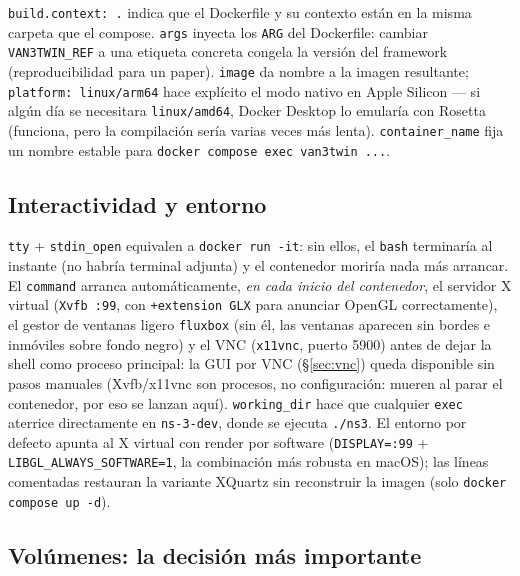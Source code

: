 \documentclass[11pt,a4paper]{article}
\begin{document}
\begin{implicacion}
\texttt{build.context: .} indica que el Dockerfile y su contexto est\'an en
la misma carpeta que el compose. \texttt{args} inyecta los \texttt{ARG} del
Dockerfile: cambiar \texttt{VAN3TWIN\_REF} a una etiqueta concreta congela la
versi\'on del framework (reproducibilidad para un paper). \texttt{image} da
nombre a la imagen resultante; \texttt{platform: linux/arm64} hace expl\'icito
el modo nativo en Apple Silicon --- si alg\'un d\'ia se necesitara
\texttt{linux/amd64}, Docker Desktop lo emular\'ia con Rosetta (funciona, pero
la compilaci\'on ser\'ia varias veces m\'as lenta). \texttt{container\_name}
fija un nombre estable para \texttt{docker compose exec van3twin ...}.
\end{implicacion}

\subsection{Interactividad y entorno}

\begin{implicacion}
\texttt{tty} + \texttt{stdin\_open} equivalen a \texttt{docker run -it}: sin
ellos, el \texttt{bash} terminar\'ia al instante (no habr\'ia terminal
adjunta) y el contenedor morir\'ia nada m\'as arrancar. El \texttt{command}
arranca autom\'aticamente, \emph{en cada inicio del contenedor}, el servidor
X virtual (\texttt{Xvfb :99}, con \texttt{+extension GLX} para anunciar
OpenGL correctamente), el gestor de ventanas ligero \texttt{fluxbox} (sin
\'el, las ventanas aparecen sin bordes e inm\'oviles sobre fondo negro) y el
VNC (\texttt{x11vnc}, puerto 5900) antes
de dejar la shell como proceso principal: la GUI por VNC
(\S\ref{sec:vnc}) queda disponible sin pasos manuales (Xvfb/x11vnc son
procesos, no configuraci\'on: mueren al parar el contenedor, por eso se
lanzan aqu\'i). \texttt{working\_dir} hace que cualquier \texttt{exec}
aterrice directamente en \texttt{ns-3-dev}, donde se ejecuta \texttt{./ns3}.
El entorno por defecto apunta al X virtual con render por software
(\texttt{DISPLAY=:99} + \texttt{LIBGL\_ALWAYS\_SOFTWARE=1}, la combinaci\'on
m\'as robusta en macOS); las l\'ineas comentadas restauran la variante
XQuartz sin reconstruir la imagen (solo \texttt{docker compose up -d}).
\end{implicacion}

\subsection{Vol\'umenes: la decisi\'on m\'as importante}
\end{document}
